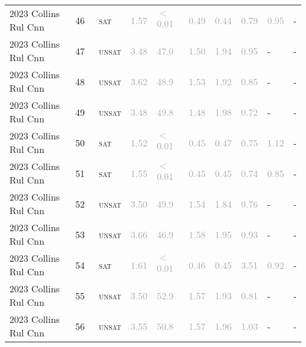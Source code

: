 \begin{center}
{\begin{longtable}{@{}llllllllll@{}}
2023 Collins Rul Cnn & 46 & ~\textsc{sat} & \textcolor{darkgray}{1.57} & \textcolor{darkgray}{$<$0.01} & \textcolor{darkgray}{0.49} & \textcolor{darkgray}{0.44} & \textcolor{darkgray}{0.79} & \textcolor{darkgray}{0.95} & - \\
2023 Collins Rul Cnn & 47 & ~\textsc{unsat} & \textcolor{darkgray}{3.48} & \textcolor{darkgray}{47.0} & \textcolor{darkgray}{1.50} & \textcolor{darkgray}{1.94} & \textcolor{darkgray}{0.95} & - & - \\
2023 Collins Rul Cnn & 48 & ~\textsc{unsat} & \textcolor{darkgray}{3.62} & \textcolor{darkgray}{48.9} & \textcolor{darkgray}{1.53} & \textcolor{darkgray}{1.92} & \textcolor{darkgray}{0.85} & - & - \\
2023 Collins Rul Cnn & 49 & ~\textsc{unsat} & \textcolor{darkgray}{3.48} & \textcolor{darkgray}{49.8} & \textcolor{darkgray}{1.48} & \textcolor{darkgray}{1.98} & \textcolor{darkgray}{0.72} & - & - \\
2023 Collins Rul Cnn & 50 & ~\textsc{sat} & \textcolor{darkgray}{1.52} & \textcolor{darkgray}{$<$0.01} & \textcolor{darkgray}{0.45} & \textcolor{darkgray}{0.47} & \textcolor{darkgray}{0.75} & \textcolor{darkgray}{1.12} & - \\
2023 Collins Rul Cnn & 51 & ~\textsc{sat} & \textcolor{darkgray}{1.55} & \textcolor{darkgray}{$<$0.01} & \textcolor{darkgray}{0.45} & \textcolor{darkgray}{0.45} & \textcolor{darkgray}{0.74} & \textcolor{darkgray}{0.85} & - \\
2023 Collins Rul Cnn & 52 & ~\textsc{unsat} & \textcolor{darkgray}{3.50} & \textcolor{darkgray}{49.9} & \textcolor{darkgray}{1.54} & \textcolor{darkgray}{1.84} & \textcolor{darkgray}{0.76} & - & - \\
2023 Collins Rul Cnn & 53 & ~\textsc{unsat} & \textcolor{darkgray}{3.66} & \textcolor{darkgray}{46.9} & \textcolor{darkgray}{1.58} & \textcolor{darkgray}{1.95} & \textcolor{darkgray}{0.93} & - & - \\
2023 Collins Rul Cnn & 54 & ~\textsc{sat} & \textcolor{darkgray}{1.61} & \textcolor{darkgray}{$<$0.01} & \textcolor{darkgray}{0.46} & \textcolor{darkgray}{0.45} & \textcolor{darkgray}{3.51} & \textcolor{darkgray}{0.92} & - \\
2023 Collins Rul Cnn & 55 & ~\textsc{unsat} & \textcolor{darkgray}{3.50} & \textcolor{darkgray}{52.9} & \textcolor{darkgray}{1.57} & \textcolor{darkgray}{1.93} & \textcolor{darkgray}{0.81} & - & - \\
2023 Collins Rul Cnn & 56 & ~\textsc{unsat} & \textcolor{darkgray}{3.55} & \textcolor{darkgray}{50.8} & \textcolor{darkgray}{1.57} & \textcolor{darkgray}{1.96} & \textcolor{darkgray}{1.03} & - & - \\

\end{longtable}}
\end{center}
